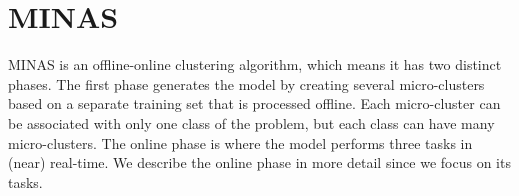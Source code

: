 \section{MINAS}
\label{sec:minas}



MINAS is an offline-online clustering algorithm, which means it has two distinct phases. The first phase generates the model by creating several micro-clusters based on a separate training set that is processed offline. Each micro-cluster can be associated with only one class of the problem, but each class can have many micro-clusters. The online phase is where the model performs three tasks in (near) real-time.
We describe the online phase in more detail since we focus on its tasks. 

